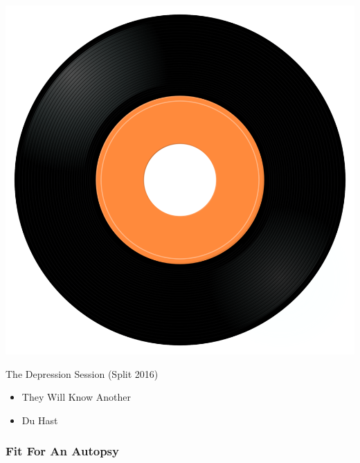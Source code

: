 \begin{minipage}[t]{0.25\textwidth}\vspace{0pt}
\captionsetup{type=figure}
\includegraphics[width=\textwidth]{Images/cover.png}
\caption*{The Depression Session (Split 2016)}
\end{minipage}
\begin{minipage}[t]{0.25\textwidth}\vspace{0pt}
\begin{itemize}[nosep,leftmargin=1em,labelwidth=*,align=left]
	\setlength{\itemsep}{0pt}
	\item They Will Know Another
	\item Du Hast
\end{itemize}
\end{minipage}

\subsubsection{Fit For An Autopsy}

